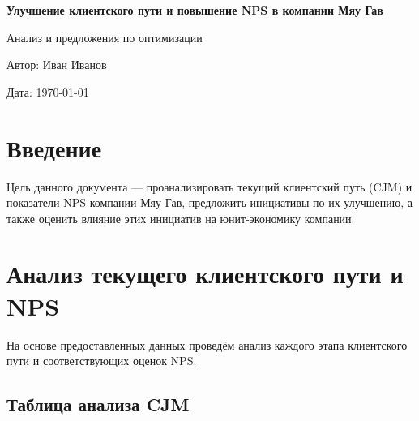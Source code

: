\documentclass[a4paper,12pt]{article}
\begin{document}
\begin{titlepage}
  \centering
  \vspace*{\fill}
  {\LARGE\bfseries Улучшение клиентского пути и повышение NPS в компании Мяу Гав\par}
  \vspace{1cm}
  {\Large Анализ и предложения по оптимизации\par}
  \vspace{2cm}
  {\large Автор: Иван Иванов\par}
  {\large Дата: \today\par}
  \vspace*{\fill}
\end{titlepage}

\tableofcontents
\newpage

\section*{Введение}

Цель данного документа — проанализировать текущий клиентский путь (CJM) и показатели NPS компании Мяу Гав, предложить инициативы по их улучшению, а также оценить влияние этих инициатив на юнит-экономику компании.

\section{Анализ текущего клиентского пути и NPS}

На основе предоставленных данных проведём анализ каждого этапа клиентского пути и соответствующих оценок NPS.

\subsection{Таблица анализа CJM}
\end{document}
